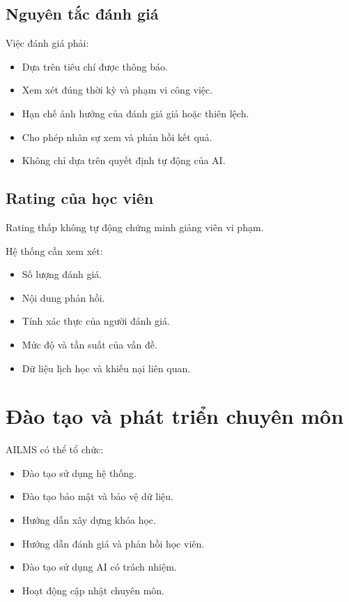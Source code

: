 \documentclass[12pt,a4paper]{article}
\begin{document}
\subsection{Nguyên tắc đánh giá}

Việc đánh giá phải:

\begin{itemize}
    \item Dựa trên tiêu chí được thông báo.
    \item Xem xét đúng thời kỳ và phạm vi công việc.
    \item Hạn chế ảnh hưởng của đánh giá giả hoặc thiên lệch.
    \item Cho phép nhân sự xem và phản hồi kết quả.
    \item Không chỉ dựa trên quyết định tự động của AI.
\end{itemize}

\subsection{Rating của học viên}

Rating thấp không tự động chứng minh giảng viên vi phạm.

Hệ thống cần xem xét:

\begin{itemize}
    \item Số lượng đánh giá.
    \item Nội dung phản hồi.
    \item Tính xác thực của người đánh giá.
    \item Mức độ và tần suất của vấn đề.
    \item Dữ liệu lịch học và khiếu nại liên quan.
\end{itemize}

\section{Đào tạo và phát triển chuyên môn}

AILMS có thể tổ chức:

\begin{itemize}
    \item Đào tạo sử dụng hệ thống.
    \item Đào tạo bảo mật và bảo vệ dữ liệu.
    \item Hướng dẫn xây dựng khóa học.
    \item Hướng dẫn đánh giá và phản hồi học viên.
    \item Đào tạo sử dụng AI có trách nhiệm.
    \item Hoạt động cập nhật chuyên môn.
\end{itemize}
\end{document}
